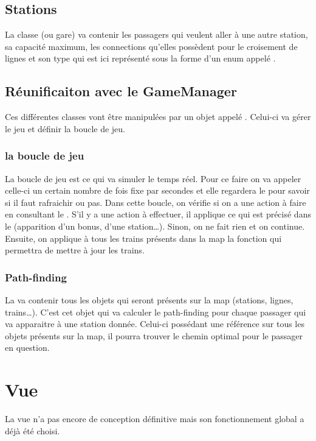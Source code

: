 \documentclass[report, backcover, french, nodocumentinfo]{upmethodology-document}
\begin{document}
			\subsection{Stations}
				La classe  (ou gare) va contenir les passagers qui veulent aller à une autre station, sa capacité maximum, les connections qu'elles possèdent pour le croisement de lignes et son type qui est ici représenté sous la forme d'un enum appelé .
			\subsection{Réunificaiton avec le GameManager}
				Ces différentes classes vont être manipulées par un objet appelé . Celui-ci va gérer le jeu et définir la boucle de jeu.
				\subsubsection{la boucle de jeu}\label{gameLoop}
					La boucle de jeu est ce qui va simuler le temps réel. Pour ce faire on va appeler celle-ci un certain nombre de fois fixe par secondes et elle regardera le  pour savoir si il faut rafraichir ou pas. Dans cette boucle, on vérifie si on a une action à faire en consultant le . S'il y a une action à effectuer, il applique ce qui est précisé dans le  (apparition d'un bonus, d'une station\ldots). Sinon, on ne fait rien et on continue. Ensuite, on applique à tous les trains présents dans la map la fonction  qui permettra de mettre à jour les trains.
				\subsubsection{Path-finding}
					La  va contenir tous les objets qui seront présents sur la map (stations, lignes, trains\ldots). C'est cet objet qui va calculer le path-finding pour chaque passager qui va apparaitre à une station donnée. Celui-ci possédant une référence sur tous les objets présents sur la map, il pourra trouver le chemin optimal pour le passager en question.
		\section{Vue}
			La vue n'a pas encore de conception définitive mais son fonctionnement global a déjà été choisi.
\end{document}
